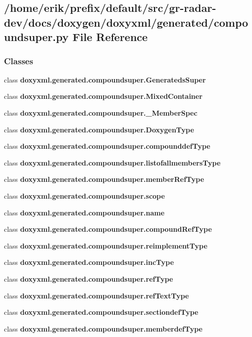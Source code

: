 \subsection{/home/erik/prefix/default/src/gr-\/radar-\/dev/docs/doxygen/doxyxml/generated/compoundsuper.py File Reference}
\label{compoundsuper_8py}
\subsubsection*{Classes}
\begin{DoxyCompactItemize}
\item 
class {\bf doxyxml.\+generated.\+compoundsuper.\+Generateds\+Super}
\item 
class {\bf doxyxml.\+generated.\+compoundsuper.\+Mixed\+Container}
\item 
class {\bf doxyxml.\+generated.\+compoundsuper.\+\_\+\+Member\+Spec}
\item 
class {\bf doxyxml.\+generated.\+compoundsuper.\+Doxygen\+Type}
\item 
class {\bf doxyxml.\+generated.\+compoundsuper.\+compounddef\+Type}
\item 
class {\bf doxyxml.\+generated.\+compoundsuper.\+listofallmembers\+Type}
\item 
class {\bf doxyxml.\+generated.\+compoundsuper.\+member\+Ref\+Type}
\item 
class {\bf doxyxml.\+generated.\+compoundsuper.\+scope}
\item 
class {\bf doxyxml.\+generated.\+compoundsuper.\+name}
\item 
class {\bf doxyxml.\+generated.\+compoundsuper.\+compound\+Ref\+Type}
\item 
class {\bf doxyxml.\+generated.\+compoundsuper.\+reimplement\+Type}
\item 
class {\bf doxyxml.\+generated.\+compoundsuper.\+inc\+Type}
\item 
class {\bf doxyxml.\+generated.\+compoundsuper.\+ref\+Type}
\item 
class {\bf doxyxml.\+generated.\+compoundsuper.\+ref\+Text\+Type}
\item 
class {\bf doxyxml.\+generated.\+compoundsuper.\+sectiondef\+Type}
\item 
class {\bf doxyxml.\+generated.\+compoundsuper.\+memberdef\+Type}
\item 

\end{DoxyCompactItemize}
